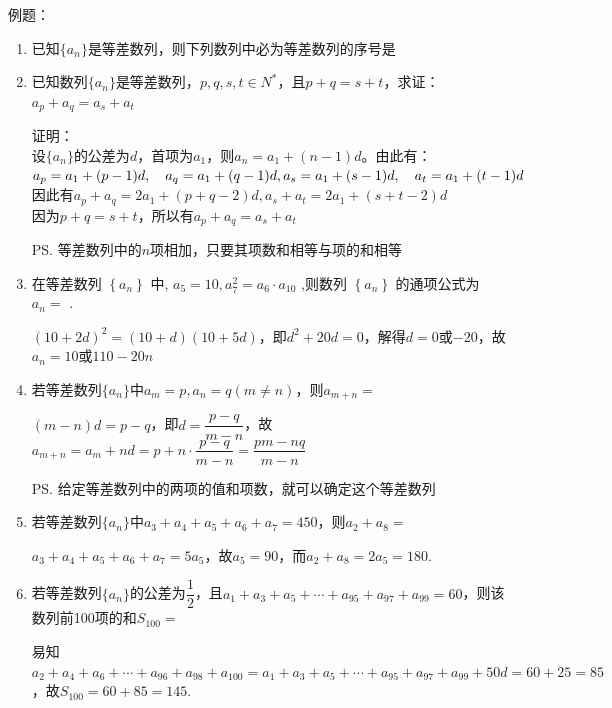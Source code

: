 例题：
\begin{enumerate}
    \item 已知$\{a_n\}$是等差数列，则下列数列中必为等差数列的序号是
    \item 已知数列$\{a_n\}$是等差数列，$p, q, s, t \in N^{*}$，且$p+q = s+t$，求证：$a_p + a_q = a_s + a_t$
    \begin{jieda}
        证明：\\
        设$\{a_n\}$的公差为$d$，首项为$a_1$，则$a_n = a_1 + (n-1)d$。由此有：\\
        $a_p = a_1 + (p-1)d, \quad a_q = a_1 + (q-1)d, \\
        a_s = a_1 + (s-1)d, \quad a_t = a_1 + (t-1)d$ \\
        因此有$a_p + a_q = 2a_1 + (p+q-2)d, a_s + a_t = 2a_1 + (s+t-2)d$ \\
        因为$p+q = s+t$，所以有$a_p + a_q = a_s + a_t$
        
        \ps 等差数列中的$n$项相加，只要其项数和相等与项的和相等
    \end{jieda}
    \item 在等差数列 $\left\{  {a}_{n}\right\}$ 中, ${a}_{5} = {10},{a}_{7}^{2} = {a}_{6} \cdot  {a}_{10}$ ,则数列 $\left\{  {a}_{n}\right\}$ 的通项公式为 ${a}_{n} =$ .
    \begin{jieda}
        $(10+2d)^2 = (10+d)(10+5d)$，即$d^2+20d = 0$，解得$d = 0$或$-20$，故$a_n = 10$或$110 - 20n$
    \end{jieda}
    \item 若等差数列$\{a_n\}$中$a_m = p, a_n = q (m \neq n)$，则$a_{m+n} = $
    \begin{jieda}
        $(m-n)d = p-q$，即$d = \dfrac{p - q}{m - n}$，故$a_{m+n} = a_m + nd = p + n \cdot \dfrac{p - q}{m - n} = \dfrac{pm - nq}{m-n}$
        
        \ps 给定等差数列中的两项的值和项数，就可以确定这个等差数列
    \end{jieda}
    \item 若等差数列$\{a_n\}$中$a_3+a_4+a_5+a_6+a_7 = 450$，则$a_2+a_8 = $
    \begin{jieda}
        $a_3+a_4+a_5+a_6+a_7 = 5a_5$，故$a_5 = 90$，而$a_2+a_8 = 2a_5 = 180$.
    \end{jieda}
    \item 若等差数列$\{a_n\}$的公差为$\dfrac{1}{2}$，且$a_1 + a_3 + a_5 +\cdots + a_{95} + a_{97} + a_{99} = 60$，则该数列前100项的和$S_{100} = $
    \begin{jieda}
        易知$a_2 + a_4 + a_6 +\cdots + a_{96} + a_{98} + a_{100} = a_1 + a_3 + a_5 +\cdots + a_{95} + a_{97} + a_{99} + 50d = 60 + 25 = 85$，故$S_{100} = 60+85 = 145$. 
    \end{jieda}


\end{enumerate}
